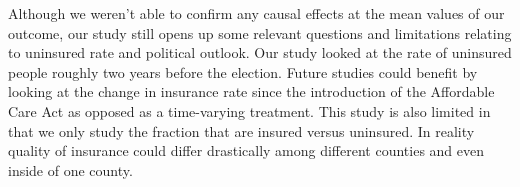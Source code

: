 \documentclass[11pt, conference,compsoc]{IEEEtran}
\begin{document}
Although we weren't able to confirm any causal effects at the mean values of our outcome, our study still opens up some relevant questions and limitations relating to uninsured rate and political outlook. Our study looked at the rate of uninsured people roughly two years before the election. Future studies could benefit by looking at the change in insurance rate since the introduction of the Affordable Care Act as opposed as a time-varying treatment. This study is also limited in that we only study the fraction that are insured versus uninsured. In reality quality of insurance could differ drastically among different counties and even inside of one county. 



%
%
%


\end{document}
